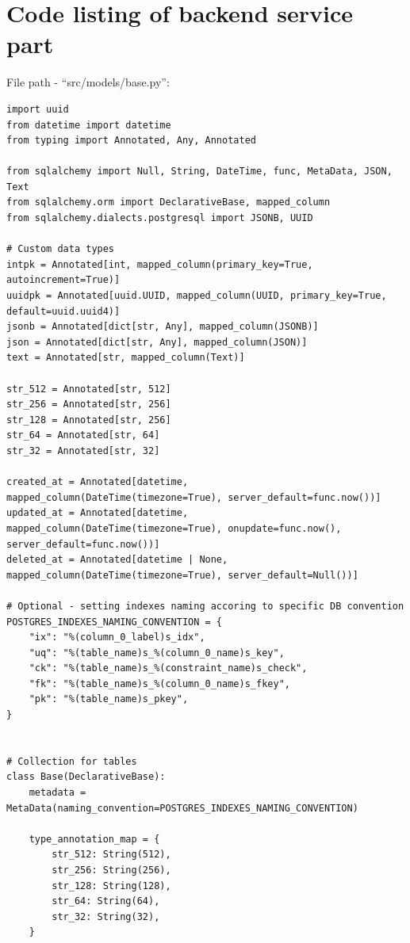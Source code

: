 \chapter{Code listing of backend service part}
File path - ``src/models/base.py'':
\begin{lstlisting}
import uuid
from datetime import datetime
from typing import Annotated, Any, Annotated

from sqlalchemy import Null, String, DateTime, func, MetaData, JSON, Text
from sqlalchemy.orm import DeclarativeBase, mapped_column
from sqlalchemy.dialects.postgresql import JSONB, UUID

# Custom data types
intpk = Annotated[int, mapped_column(primary_key=True, autoincrement=True)]
uuidpk = Annotated[uuid.UUID, mapped_column(UUID, primary_key=True, default=uuid.uuid4)]
jsonb = Annotated[dict[str, Any], mapped_column(JSONB)]
json = Annotated[dict[str, Any], mapped_column(JSON)]
text = Annotated[str, mapped_column(Text)]

str_512 = Annotated[str, 512]
str_256 = Annotated[str, 256]
str_128 = Annotated[str, 256]
str_64 = Annotated[str, 64]
str_32 = Annotated[str, 32]

created_at = Annotated[datetime, mapped_column(DateTime(timezone=True), server_default=func.now())]
updated_at = Annotated[datetime, mapped_column(DateTime(timezone=True), onupdate=func.now(), server_default=func.now())]
deleted_at = Annotated[datetime | None, mapped_column(DateTime(timezone=True), server_default=Null())]

# Optional - setting indexes naming accoring to specific DB convention
POSTGRES_INDEXES_NAMING_CONVENTION = {
    "ix": "%(column_0_label)s_idx",
    "uq": "%(table_name)s_%(column_0_name)s_key",
    "ck": "%(table_name)s_%(constraint_name)s_check",
    "fk": "%(table_name)s_%(column_0_name)s_fkey",
    "pk": "%(table_name)s_pkey",
}


# Collection for tables
class Base(DeclarativeBase):
    metadata = MetaData(naming_convention=POSTGRES_INDEXES_NAMING_CONVENTION)

    type_annotation_map = {
        str_512: String(512),
        str_256: String(256),
        str_128: String(128),
        str_64: String(64),
        str_32: String(32),
    }
\end{lstlisting}

\clearpage

